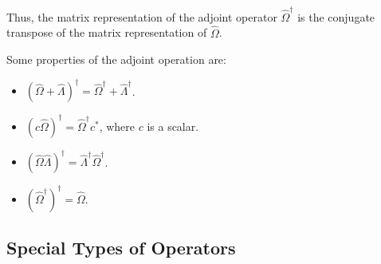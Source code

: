 \documentclass[12pt,a4paper]{report}
\begin{document}
Thus, the matrix representation of the adjoint operator $\hat{\Omega}^\dagger$ is the conjugate transpose of the matrix representation of $\hat{\Omega}$.


Some properties of the adjoint operation are:
\begin{itemize}
    \item $(\hat{\Omega} + \hat{\Lambda})^\dagger = \hat{\Omega}^\dagger + \hat{\Lambda}^\dagger$.
    \item $(c\hat{\Omega})^\dagger = \hat{\Omega}^\dagger c^*$, where $c$ is a scalar.
    \item $(\hat{\Omega}\hat{\Lambda})^\dagger = \hat{\Lambda}^\dagger \hat{\Omega}^\dagger$.
    \item $(\hat{\Omega}^\dagger)^\dagger = \hat{\Omega}$.
\end{itemize}

\subsection{Special Types of Operators}
\end{document}
